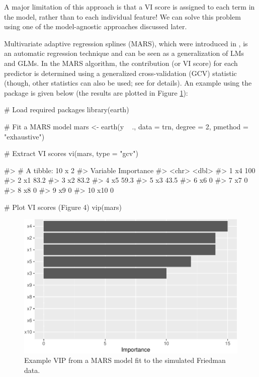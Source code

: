 A major limitation of this approach is that a VI score is assigned to
each term in the model, rather than to each individual feature! We can
solve this problem using one of the model-agnostic approaches discussed
later.

Multivariate adaptive regression splines (MARS), which were introduced
in \citet{multivariate-friedman-1991}, is an automatic regression
technique and can be seen as a generalization of LMs and GLMs. In the
MARS algorithm, the contribution (or VI score) for each predictor is
determined using a generalized cross-validation (GCV) statistic (though,
other statistics can also be used; see  for
details). An example using the  package
\citep{R-earth-fixed} is given below (the results are plotted in Figure
\ref{fig:vip-earth}):

\begin{Schunk}
\begin{Sinput}
# Load required packages
library(earth)

# Fit a MARS model
mars <- earth(y ~ ., data = trn, degree = 2, pmethod = "exhaustive")

# Extract VI scores
vi(mars, type = "gcv")
\end{Sinput}
\begin{Soutput}
#> # A tibble: 10 x 2
#>    Variable Importance
#>    <chr>         <dbl>
#>  1 x4            100
#>  2 x1             83.2
#>  3 x2             83.2
#>  4 x5             59.3
#>  5 x3             43.5
#>  6 x6              0
#>  7 x7              0
#>  8 x8              0
#>  9 x9              0
#> 10 x10             0
\end{Soutput}
\begin{Sinput}
# Plot VI scores (Figure 4)
vip(mars)
\end{Sinput}
\begin{figure}[!htb]

{\centering \includegraphics[width=0.7\linewidth]{greenwell-boehmke_files/figure-latex/vip-earth-1}

}

\caption[Example VIP from a MARS model fit to the simulated Friedman data]{Example VIP from a MARS model fit to the simulated Friedman data.}\label{fig:vip-earth}
\end{figure}
\end{Schunk}

